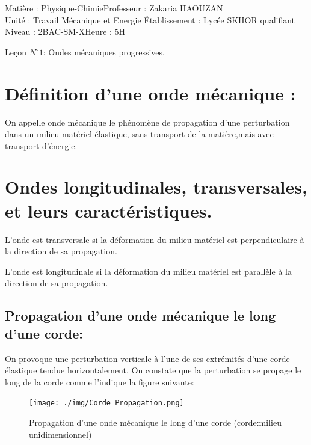 \documentclass[12pt]{article}
\author{Zakaria HAOUZAN}
\date{\today}
\newcommand\headerMe[2]{\noindent{}#1\hfill#2}
\begin{document}
\headerMe{Matière : Physique-Chimie}{Professeur : Zakaria HAOUZAN}\\
\headerMe{Unité : Travail Mécanique et Energie }{Établissement : Lycée SKHOR qualifiant}\\
\headerMe{Niveau : 2BAC-SM-X}{Heure : 5H}\\

\begin{center}

    \Large{Leçon $N^{\circ} 1 $: \color{red}Ondes mécaniques progressives. }
\end{center}



\section{ Définition d’une onde mécanique : }

On appelle onde mécanique le phénomène de propagation d’une perturbation dans un milieu matériel élastique, sans transport de la matière,mais avec transport d'énergie.
\section{ Ondes longitudinales, transversales, et leurs caractéristiques. }

L'onde est transversale si la déformation du milieu matériel est perpendiculaire à la direction de sa propagation.

L'onde est longitudinale si la déformation du milieu matériel est parallèle à la direction de sa propagation.


\subsection{Propagation d'une onde mécanique le long d'une corde:}
On provoque une perturbation verticale à l'une de ses extrémités d'une corde élastique tendue horizontalement. On constate que la perturbation se propage le long de la corde comme l'indique la figure suivante:
\begin{figure}

	
	\texttt{[image: ./img/Corde Propagation.png]}
	\caption{Propagation d'une onde mécanique le long d'une corde (corde:milieu unidimensionnel)}
\end{figure}
\end{document}
